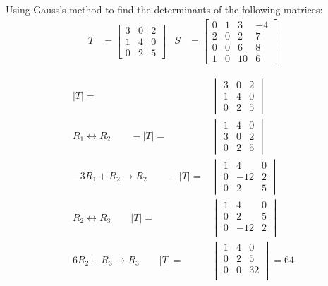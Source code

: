\begin{example} \label{ex:det:gauss}
Using Gauss's method to find the determinants of the following matrices:
%
\begin{align*}
T & = \begin{bmatrix}
3 & 0 & 2 \\
1 & 4 & 0 \\
0 & 2 & 5 
\end{bmatrix} & S & = \begin{bmatrix}
0 & 1 & 3  & -4 \\
2 & 0 & 2 & 7 \\
0 & 0 & 6 & 8 \\
1 & 0 & 10 & 6 
\end{bmatrix}
\end{align*}

\solution

\begin{align*}
|T|  = & \begin{vmatrix}
3 & 0 & 2 \\
1 & 4 & 0 \\
0 & 2 & 5 
\end{vmatrix}\\
R_1 \leftrightarrow R_2  \qquad -|T|= &  \begin{vmatrix}
1 & 4 & 0 \\
3 & 0 & 2 \\
0 & 2 & 5 
\end{vmatrix} \\
-3 R_1 + R_2 \rightarrow R_2 \qquad -|T|  = &
 \begin{vmatrix}
1 & 4 & 0 \\
0 & -12 & 2 \\
0 & 2 & 5 
\end{vmatrix} \\
R_2 \leftrightarrow R_3 \qquad  |T|= &
 \begin{vmatrix}
1 & 4 & 0 \\
0 & 2 & 5 \\
0 & -12 & 2 \\
\end{vmatrix} \\
6 R_2 + R_3 \rightarrow R_3 \qquad |T| = &
 \begin{vmatrix}
1 & 4 & 0 \\
0 & 2 & 5 \\
0 & 0 & 32 \\
\end{vmatrix} = 64 
\end{align*}


\end{example}
